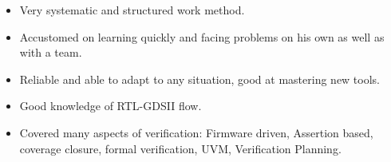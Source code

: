 

\begin{cvparagraph}
  \begin{itemize}[nosep, noitemsep]
    \item {Very systematic and structured work method.}
    \item {Accustomed on learning quickly and facing problems on his own as well as with a team.}
    \item {Reliable and able to adapt to any situation, good at mastering new tools.}
    \item {Good knowledge of RTL-GDSII flow.}
    \item {Covered many aspects of verification: Firmware driven, Assertion based, coverage closure, formal verification, UVM, Verification Planning.}
  \end{itemize}
\end{cvparagraph}
